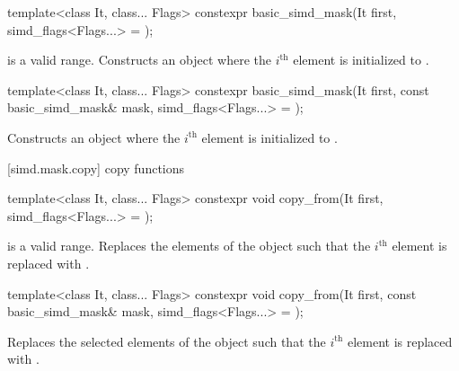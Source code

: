\begin{itemdecl}
template<class It, class... Flags>
  constexpr basic_simd_mask(It first, simd_flags<Flags...> = {});
\end{itemdecl}

\begin{itemdescr}
  \MaskLoadDescr
    {\tcode{[first, first + size())} is a valid range.}
    {Constructs an object where the $i^\text{th}$ element is initialized to  \foralli.}
\end{itemdescr}

\begin{itemdecl}
template<class It, class... Flags>
  constexpr basic_simd_mask(It first, const basic_simd_mask& mask, simd_flags<Flags...> = {});
\end{itemdecl}

\begin{itemdescr}
  \MaskLoadDescr
    {\validMaskedRange}
    {Constructs an object where the $i^\text{th}$ element is initialized to  \foralli.}
\end{itemdescr}

[simd.mask.copy]{ copy functions}

\begin{itemdecl}
template<class It, class... Flags>
  constexpr void copy_from(It first, simd_flags<Flags...> = {});
\end{itemdecl}

\begin{itemdescr}
  \MaskLoadDescr
  {\tcode{[first, first + size())} is a valid range.}
  {Replaces the elements of the  object such that the $i^\text{th}$ element is replaced with  \foralli.}
\end{itemdescr}

\begin{itemdecl}
template<class It, class... Flags>
  constexpr void copy_from(It first, const basic_simd_mask& mask, simd_flags<Flags...> = {});
\end{itemdecl}

\begin{itemdescr}
  \MaskLoadDescr
    {\validMaskedRange}
    {Replaces the selected elements of the  object such that the $i^\text{th}$ element is replaced with  \forallmaskedi.}
\end{itemdescr}

